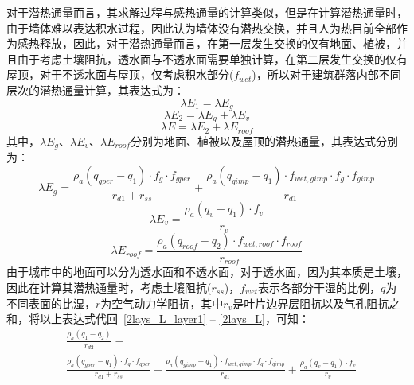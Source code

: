 对于潜热通量而言，其求解过程与感热通量的计算类似，但是在计算潜热通量时，由于墙体难以表达积水过程，因此认为墙体没有潜热交换，并且人为热目前全部作为感热释放，因此，对于潜热通量而言，在第一层发生交换的仅有地面、植被，并且由于考虑土壤阻抗，透水面与不透水面需要单独计算，在第二层发生交换的仅有屋顶，对于不透水面与屋顶，仅考虑积水部分($f_{wet}$)，所以对于建筑群落内部不同层次的潜热通量计算，其表达式为：
\begin{equation}\label{2lays_L_layer1}
    \lambda E_{1} = \lambda E_{g}
\end{equation}
%
\begin{equation}
    \lambda E_{2} = \lambda E_{g} + \lambda E_{v}
\end{equation}
%
\begin{equation}\label{2lays_L}
    \lambda E = \lambda E_{2} + \lambda E_{roof}
\end{equation}
其中，$\lambda E_{g}$、$\lambda E_{v}$、$\lambda E_{roof}$分别为地面、植被以及屋顶的潜热通量，其表达式分别为：
\begin{equation}\label{urban_Eg}
    \lambda E_{g} = \frac{\rho _a \left( q_{gper}-q_{1} \right) \cdot f_{g} \cdot f_{gper}}{r_{d1}+r_{ss}} + \frac{\rho _a \left( q_{gimp}-q_{1} \right) \cdot f_{wet,gimp} \cdot f_{g} \cdot f_{gimp}}{r_{d1}}
\end{equation}
%
\begin{equation}
    \lambda E_{v} = \frac{\rho _a \left( q_{v}-q_{1}\right) \cdot f_v}{r_{v}}
\end{equation}
%
\begin{equation}\label{urban_Eroof}
    \lambda E_{roof} = \frac{\rho _a \left( q_{roof}-q_{2}\right) \cdot f_{wet,roof} \cdot f_{roof}}{r_{roof}}
\end{equation}
由于城市中的地面可以分为透水面和不透水面，对于透水面，因为其本质是土壤，因此在计算其潜热通量时，考虑土壤阻抗($r_{ss}$)，$f_{wet}$表示各部分干湿的比例，$q$为不同表面的比湿，$r$为空气动力学阻抗，其中$r_v$是叶片边界层阻抗以及气孔阻抗之和，将以上表达式代回~\ref{2lays_L_layer1} -- \ref{2lays_L}，可知：
\begin{equation}
   \begin{split}
    & \frac{\rho _a \left( q_{1}-q_{2}\right)}{r_{d2}} = \\
    & \frac{\rho _a \left( q_{gper}-q_{1}\right) \cdot f_{g} \cdot f_{gper}}{r_{d1}+r_{ss}} + \frac{\rho _a \left( q_{gimp}-q_{1} \right) \cdot f_{wet,gimp} \cdot f_{g} \cdot f_{gimp}}{r_{d1}} + \frac{\rho _a \left( q_{v}-q_{1}\right) \cdot f_v}{r_{v}}
   \end{split} 
\end{equation}
